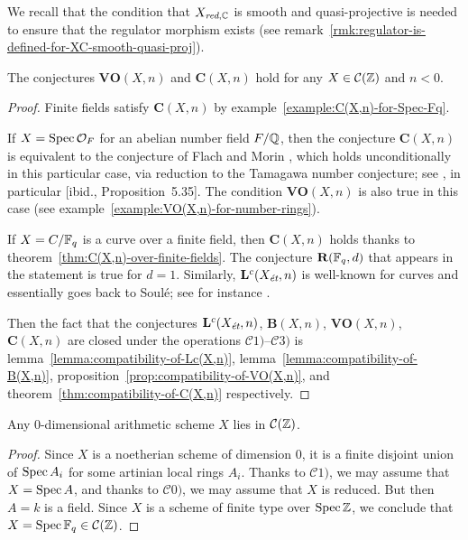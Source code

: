 \documentclass{article}
\numberwithin{equation}{section}
\begin{document}
We recall that the condition that $X_{\red,\CC}$ is smooth and quasi-projective
is needed to ensure that the regulator morphism exists
(see remark~\ref{rmk:regulator-is-defined-for-XC-smooth-quasi-proj}).

\begin{proposition}
  \label{prop:C(X,n)-holds-for-C(Z)}
  The conjectures $\mathbf{VO} (X,n)$ and $\mathbf{C} (X,n)$ hold for any
  $X \in \mathcal{C} (\ZZ)$ and $n < 0$.

  \begin{proof}
    Finite fields satisfy $\mathbf{C} (X,n)$ by
    example~\ref{example:C(X,n)-for-Spec-Fq}.

    If $X = \Spec \mathcal{O}_F$ for an abelian number field $F/\QQ$, then the
    conjecture $\mathbf{C} (X,n)$ is equivalent to the conjecture of Flach and
    Morin \cite[Conjecture~5.12]{Flach-Morin-2018}, which holds unconditionally
    in this particular case, via reduction to the Tamagawa number conjecture;
    see \cite[\S 5.8.3]{Flach-Morin-2018}, in particular
    [ibid., Proposition~5.35]. The condition $\mathbf{VO} (X,n)$ is also true in
    this case (see example~\ref{example:VO(X,n)-for-number-rings}).

    If $X = C/\FF_q$ is a curve over a finite field, then $\mathbf{C} (X,n)$
    holds thanks to theorem~\ref{thm:C(X,n)-over-finite-fields}. The conjecture
    $\mathbf{R} (\FF_q,d)$ that appears in the statement is true for
    $d = 1$. Similarly, $\mathbf{L}^c (X_\et,n)$ is well-known for curves
    and essentially goes back to Soulé; see for instance
    \cite[Proposition~4.3]{Geisser-2017}.

    Then the fact that the conjectures $\mathbf{L}^c (X_\et,n)$,
    $\mathbf{B} (X,n)$, $\mathbf{VO} (X,n)$, $\mathbf{C} (X,n)$ are closed under
    the operations $\mathcal{C}1)$--$\mathcal{C}3)$ is
    lemma~\ref{lemma:compatibility-of-Lc(X,n)},
    lemma~\ref{lemma:compatibility-of-B(X,n)},
    proposition~\ref{prop:compatibility-of-VO(X,n)},
    and theorem~\ref{thm:compatibility-of-C(X,n)}
    respectively.
  \end{proof}
\end{proposition}

\begin{lemma}
  Any $0$-dimensional arithmetic scheme $X$ lies in $\mathcal{C} (\ZZ)$.

  \begin{proof}
    Since $X$ is a noetherian scheme of dimension $0$, it is a finite disjoint
    union of $\Spec A_i$ for some artinian local rings $A_i$. Thanks to
    $\mathcal{C}1)$, we may assume that $X = \Spec A$, and thanks to
    $\mathcal{C}0)$, we may assume that $X$ is reduced. But then $A = k$ is a
    field. Since $X$ is a scheme of finite type over $\Spec \ZZ$, we conclude
    that $X = \Spec \FF_q \in \mathcal{C} (\ZZ)$.
  \end{proof}
\end{lemma}
\end{document}

